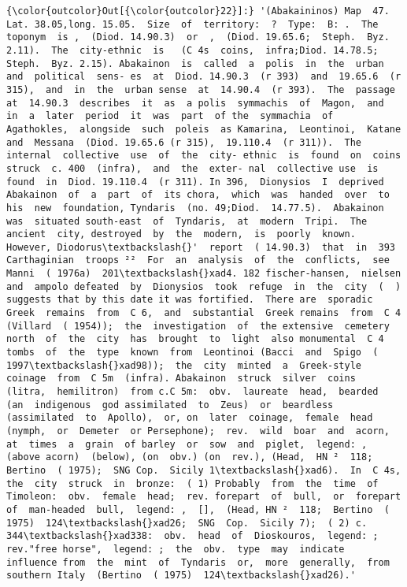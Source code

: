 \documentclass[11pt]{article}
\begin{document}
            \begin{Verbatim}[commandchars=\\\{\}]
{\color{outcolor}Out[{\color{outcolor}22}]:} '(Abakaininos) Map  47.  Lat. 38.05,long. 15.05.  Size  of  territory:  ?  Type:  B: .  The  toponym  is ,  (Diod. 14.90.3)  or  ,  (Diod. 19.65.6;  Steph.  Byz. 2.11).  The  city-ethnic  is   (C 4s  coins,  infra;Diod. 14.78.5;  Steph.  Byz. 2.15). Abakainon  is  called  a  polis  in  the  urban  and  political  sens- es  at  Diod. 14.90.3  (r 393)  and  19.65.6  (r 315),  and  in  the  urban sense  at  14.90.4  (r 393).  The  passage  at  14.90.3  describes  it  as  a polis  symmachis  of  Magon,  and  in  a  later  period  it  was  part  of the  symmachia  of  Agathokles,  alongside  such  poleis  as Kamarina,  Leontinoi,  Katane  and  Messana  (Diod. 19.65.6 (r 315),  19.110.4  (r 311)).  The  internal  collective  use  of  the  city- ethnic  is  found  on  coins  struck  c. 400  (infra),  and  the  exter- nal  collective use  is  found  in  Diod. 19.110.4  (r 311). In 396,  Dionysios  I  deprived  Abakainon  of  a  part  of  its chora,  which  was  handed  over  to  his  new  foundation, Tyndaris  (no. 49;Diod.  14.77.5).  Abakainon  was  situated south-east  of  Tyndaris,  at  modern  Tripi.  The  ancient  city, destroyed  by  the  modern,  is  poorly  known.  However, Diodorus\textbackslash{}'  report  ( 14.90.3)  that  in  393  Carthaginian  troops ²²  For  an  analysis  of  the  conflicts,  see  Manni  ( 1976a)  201\textbackslash{}xad4. 182 fischer-hansen,  nielsen  and  ampolo defeated  by  Dionysios  took  refuge  in  the  city  (  ) suggests that by this date it was fortified.  There are  sporadic  Greek  remains  from  C 6,  and  substantial  Greek remains  from  C 4  (Villard  ( 1954));  the  investigation  of  the extensive  cemetery  north  of  the  city  has  brought  to  light  also monumental  C 4  tombs  of  the  type  known  from  Leontinoi (Bacci  and  Spigo  ( 1997\textbackslash{}xad98));  the  city  minted  a  Greek-style coinage  from  C 5m  (infra). Abakainon  struck  silver  coins  (litra,  hemilitron)  from c.C 5m:  obv.  laureate  head,  bearded  (an  indigenous  god assimilated  to  Zeus)  or  beardless  (assimilated  to  Apollo),  or, on  later  coinage,  female  head  (nymph,  or  Demeter  or Persephone);  rev.  wild  boar  and  acorn,  at  times  a  grain  of barley  or  sow  and  piglet,  legend: ,  (above acorn)  (below), (on  obv.) (on  rev.), (Head,  HN ²  118;  Bertino  ( 1975);  SNG Cop.  Sicily 1\textbackslash{}xad6).  In  C 4s,  the  city  struck  in  bronze:  ( 1) Probably  from  the  time  of  Timoleon:  obv.  female  head;  rev. forepart  of  bull,  or  forepart  of  man-headed  bull,  legend: ,  [],  (Head, HN ²  118;  Bertino  ( 1975)  124\textbackslash{}xad26;  SNG  Cop.  Sicily 7);  ( 2) c. 344\textbackslash{}xad338:  obv.  head  of  Dioskouros,  legend: ;  rev."free horse",  legend: ;  the  obv.  type  may  indicate  influence from  the  mint  of  Tyndaris  or,  more  generally,  from  southern Italy  (Bertino  ( 1975)  124\textbackslash{}xad26).'
\end{Verbatim}
        
\end{document}
